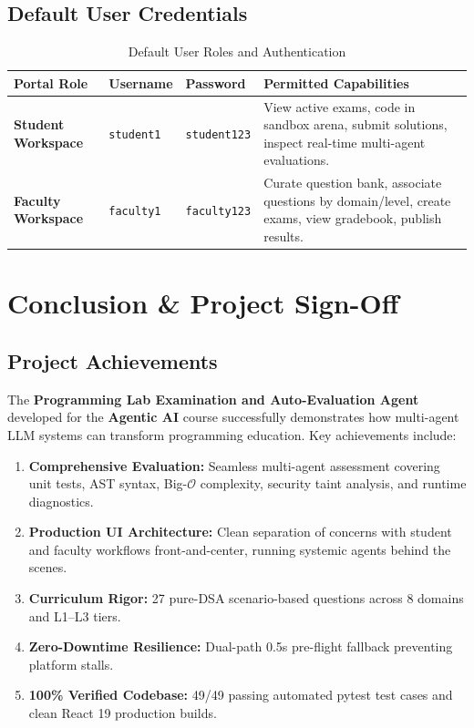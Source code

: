 \documentclass[12pt, a4paper]{report}
\begin{document}
\section{Default User Credentials}
\begin{table}[H]
\centering
\caption{Default User Roles and Authentication}
\renewcommand{\arraystretch}{1.2}
\small
\begin{tabular}{|L{3.5cm}|L{2.5cm}|L{2.5cm}|L{7.5cm}|}
\hline
{}
\color{white}\textbf{Portal Role} & \color{white}\textbf{Username} & \color{white}\textbf{Password} & \color{white}\textbf{Permitted Capabilities} \\
\hline
\textbf{Student Workspace} & \texttt{student1} & \texttt{student123} & View active exams, code in sandbox arena, submit solutions, inspect real-time multi-agent evaluations. \\
\hline
{}
\textbf{Faculty Workspace} & \texttt{faculty1} & \texttt{faculty123} & Curate question bank, associate questions by domain/level, create exams, view gradebook, publish results. \\
\hline
\end{tabular}
\end{table}

\chapter{Conclusion \& Project Sign-Off}

\section{Project Achievements}
The \textbf{Programming Lab Examination and Auto-Evaluation Agent} developed for the \textbf{Agentic AI} course successfully demonstrates how multi-agent LLM systems can transform programming education. Key achievements include:
\begin{enumerate}[itemsep=2pt,leftmargin=1.5em]
    \item \textbf{Comprehensive Evaluation:} Seamless multi-agent assessment covering unit tests, AST syntax, Big-$\mathcal{O}$ complexity, security taint analysis, and runtime diagnostics.
    \item \textbf{Production UI Architecture:} Clean separation of concerns with student and faculty workflows front-and-center, running systemic agents behind the scenes.
    \item \textbf{Curriculum Rigor:} 27 pure-DSA scenario-based questions across 8 domains and L1--L3 tiers.
    \item \textbf{Zero-Downtime Resilience:} Dual-path 0.5s pre-flight fallback preventing platform stalls.
    \item \textbf{100\% Verified Codebase:} 49/49 passing automated pytest test cases and clean React 19 production builds.
\end{enumerate}
\end{document}
